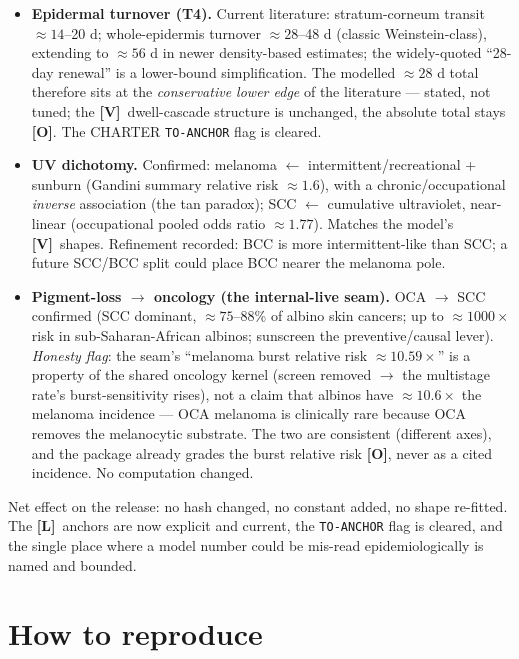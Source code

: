 \documentclass[11pt,a4paper]{article}
\newcommand{\V}{\textcolor{gV}{\textbf{[V]}}}
\newcommand{\Lg}{\textcolor{gL}{\textbf{[L]}}}
\newcommand{\Og}{\textcolor{gO}{\textbf{[O]}}}
\newcommand{\mul}{\ensuremath{\times}}
\newcommand{\apx}{\ensuremath{\approx}}
\begin{document}
\begin{itemize}[leftmargin=1.4em,itemsep=2pt]
\item \textbf{Epidermal turnover (T4).} Current literature: stratum-corneum transit $\apx 14$--20 d;
whole-epidermis turnover $\apx 28$--48 d (classic Weinstein-class), extending to $\apx 56$ d in newer density-based
estimates; the widely-quoted ``28-day renewal'' is a lower-bound simplification. The modelled $\apx 28$ d total
therefore sits at the \emph{conservative lower edge} of the literature --- stated, not tuned; the \V\ dwell-cascade
structure is unchanged, the absolute total stays \Og. The CHARTER \texttt{TO-ANCHOR} flag is cleared.
\item \textbf{UV dichotomy.} Confirmed: melanoma $\leftarrow$ intermittent/recreational + sunburn (Gandini summary
relative risk $\apx 1.6$), with a chronic/occupational \emph{inverse} association (the tan paradox); SCC
$\leftarrow$ cumulative ultraviolet, near-linear (occupational pooled odds ratio $\apx 1.77$). Matches the model's
\V\ shapes. Refinement recorded: BCC is more intermittent-like than SCC; a future SCC/BCC split could place BCC
nearer the melanoma pole.
\item \textbf{Pigment-loss $\to$ oncology (the internal-live seam).} OCA $\to$ SCC confirmed (SCC dominant,
$\apx 75$--88\% of albino skin cancers; up to $\apx 1000\mul$ risk in sub-Saharan-African albinos; sunscreen the
preventive/causal lever). \emph{Honesty flag}: the seam's ``melanoma burst relative risk $\apx 10.59\mul$'' is a
property of the shared oncology kernel (screen removed $\to$ the multistage rate's burst-sensitivity rises), not a
claim that albinos have $\apx 10.6\mul$ the melanoma incidence --- OCA melanoma is clinically rare because OCA
removes the melanocytic substrate. The two are consistent (different axes), and the package already grades the burst
relative risk \Og, never as a cited incidence. No computation changed.
\end{itemize}

Net effect on the release: no hash changed, no constant added, no shape re-fitted. The \Lg\ anchors are now
explicit and current, the \texttt{TO-ANCHOR} flag is cleared, and the single place where a model number could be
mis-read epidemiologically is named and bounded.

\section{How to reproduce}\label{app:reproduce}
\end{document}
